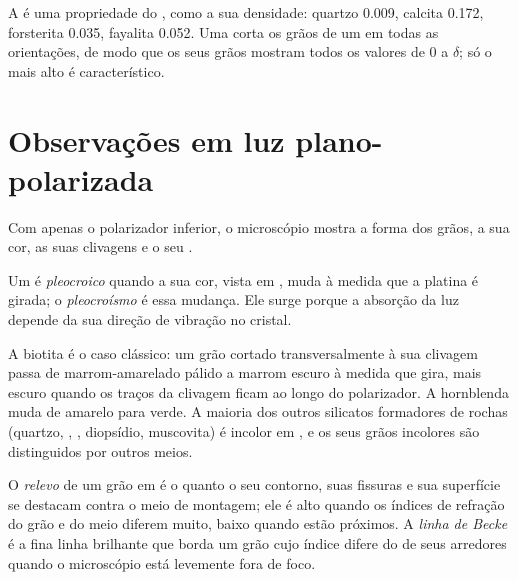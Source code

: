 A  é uma propriedade do , como a sua densidade: quartzo \num{0.009}, calcita \num{0.172}, forsterita \num{0.035}, fayalita \num{0.052}. Uma  corta os grãos de um  em todas as orientações, de modo que os seus grãos mostram todos os valores de 0 a $\delta$; só o mais alto é característico.

\section{Observações em luz plano-polarizada}

Com apenas o polarizador inferior, o microscópio mostra a forma dos grãos, a sua cor, as suas clivagens e o seu .

\begin{definition}[Pleocroísmo]\label{def:b1:optical-mineralogy:pleochroism}
Um  é \emph{pleocroico} quando a sua cor, vista em , muda à medida que a platina é girada; o \emph{pleocroísmo} é essa mudança. Ele surge porque a absorção da luz depende da sua direção de vibração no cristal.
\end{definition}

A biotita é o caso clássico: um grão cortado transversalmente à sua clivagem passa de marrom-amarelado pálido a marrom escuro à medida que gira, mais escuro quando os traços da clivagem ficam ao longo do polarizador. A hornblenda muda de amarelo para verde. A maioria dos outros silicatos formadores de rochas (quartzo, , , diopsídio, muscovita) é incolor em , e os seus grãos incolores são distinguidos por outros meios.

\begin{definition}\label{def:b1:optical-mineralogy:relief}
O \emph{relevo} de um grão em  é o quanto o seu contorno, suas fissuras e sua superfície se destacam contra o meio de montagem; ele é alto quando os índices de refração do grão e do meio diferem muito, baixo quando estão próximos. A \emph{linha de Becke} é a fina linha brilhante que borda um grão cujo índice difere do de seus arredores quando o microscópio está levemente fora de foco.
\end{definition}

